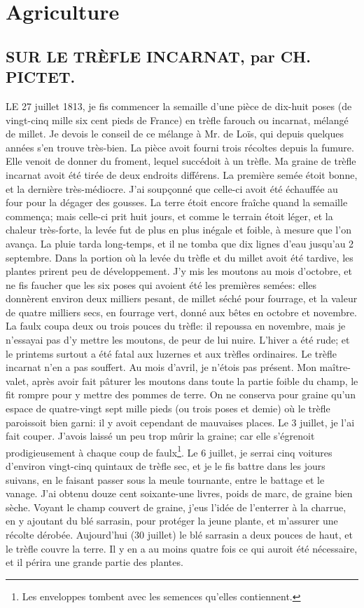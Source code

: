 \setcounter{page}{260}
\chapter{Agriculture}
\section{SUR LE TRÈFLE INCARNAT, par CH. PICTET.}
LE 27 juillet 1813, je fis commencer la semaille d'une pièce de dix-huit poses (de vingt-cinq mille six cent pieds de France) en trèfle farouch ou incarnat, mélangé de millet. Je devois le conseil de ce mélange à Mr. de Loïs, qui depuis quelques années s'en trouve très-bien.
La pièce avoit fourni trois récoltes depuis la fumure. Elle venoit de donner du froment, lequel succédoit à un trèfle. Ma graine de trèfle incarnat avoit été tirée de deux endroits différens. La première semée étoit bonne, et la dernière très-médiocre. J'ai soupçonné que celle-ci avoit été échauffée\setcounter{page}{261} au four pour la dégager des gousses. La terre étoit encore fraîche quand la semaille commença; mais celle-ci prit huit jours, et comme le terrain étoit léger, et la chaleur très-forte, la levée fut de plus en plus inégale et foible, à mesure que l'on avança. La pluie tarda long-temps, et il ne tomba que dix lignes d'eau jusqu'au 2 septembre. Dans la portion où la levée du trèfle et du millet avoit été tardive, les plantes prirent peu de développement. J'y mis les moutons au mois d'octobre, et ne fis faucher que les six poses qui avoient été les premières semées: elles donnèrent environ deux milliers pesant, de millet séché pour fourrage, et la valeur de quatre milliers secs, en fourrage vert, donné aux bêtes en octobre et novembre. La faulx coupa deux ou trois pouces du trèfle: il repoussa en novembre, mais je n'essayai pas d'y mettre les moutons, de peur de lui nuire.
L'hiver a été rude; et le printems surtout a été fatal aux luzernes et aux trèfles ordinaires. Le trèfle incarnat n'en a pas souffert. Au mois d'avril, je n'étois pas présent. Mon maître-valet, après avoir fait pâturer les moutons dans toute la partie foible du champ, le fit rompre pour y mettre des pommes de terre. On ne conserva pour graine\setcounter{page}{262} qu'un espace de quatre-vingt sept mille pieds (ou trois poses et demie) où le trèfle paroissoit bien garni: il y avoit cependant de mauvaises places. Le 3 juillet, je l'ai fait couper. J'avois laissé un peu trop mûrir la graine; car elle s'égrenoit prodigieusement à chaque coup de faulx\footnote{Les enveloppes tombent avec les semences qu'elles contiennent.}. Le 6 juillet, je serrai cinq voitures d'environ vingt-cinq quintaux de trèfle sec, et je le fis battre dans les jours suivans, en le faisant passer sous la meule tournante, entre le battage et le vanage. J'ai obtenu douze cent soixante-une livres, poids de marc, de graine bien sèche. Voyant le champ couvert de graine, j'eus l'idée de l'enterrer à la charrue, en y ajoutant du blé sarrasin, pour protéger la jeune plante, et m'assurer une récolte dérobée. Aujourd'hui (30 juillet) le blé sarrasin a deux pouces de haut, et le trèfle couvre la terre. Il y en a au moins quatre fois ce qui auroit été nécessaire, et il périra une grande partie des plantes.
